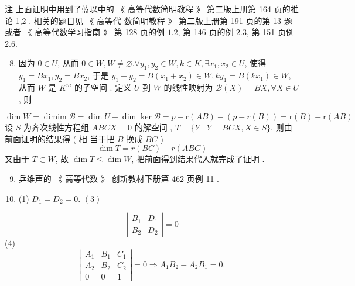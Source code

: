 \documentclass[10pt]{article}
\begin{document}
 注   上面证明中用到了蓝以中的 《 高等代数简明教程 》 第二版上册第  164  页的推论  1,2 .  相关的题目见  《 高等代   数简明教程 》 第二版上册第  191  页的第  13  题或者 《 高等代数学习指南 》 第  128  页的例  $1.2$,  第  146  页的例  $2.3$,  第  151  页例  $2.6$.

\begin{enumerate}
  \setcounter{enumi}{7}
  \item  因为  $0 \in U$,  从而  $0 \in W, W \neq \varnothing . \forall y_{1}, y_{2} \in W, k \in K, \exists x_{1}, x_{2} \in U$,  使得  $y_{1}=B x_{1}, y_{2}=B x_{2}$,  于是  $y_{1}+y_{2}=B\left(x_{1}+x_{2}\right) \in W, k y_{1}=B\left(k x_{1}\right) \in W$, 从而  $W$  是  $K^{m}$  的子空间 .  定义  $U$  到  $W$  的线性映射为  $\mathscr{B}(X)=B X, \forall X \in U$,  则 
\end{enumerate}
$$
\operatorname{dim} W=\operatorname{dimim} \mathscr{B}=\operatorname{dim} U-\operatorname{dim} \operatorname{ker} \mathscr{B}=p-\mathrm{r}(A B)-(p-r(B))=\mathrm{r}(B)-\mathrm{r}(A B)
$$
 设  $S$  为齐次线性方程组  $A B C X=0$  的解空间 , $T=\{Y \mid Y=B C X, X \in S\}$,  则由前面证明的结果得  ( 相   当于把  $B$  换成  $B C$ )
$$
\operatorname{dim} T=r(B C)-r(A B C)
$$
 又由于  $T \subset W$,  故  $\operatorname{dim} T \leqslant \operatorname{dim} W$,  把前面得到结果代入就完成了证明 .

\begin{enumerate}
  \setcounter{enumi}{8}
  \item  乒维声的 《 高等代数 》 创新教材下册第  462  页例  11 .

  \item (1) $D_{1}=D_{2}=0$. $(3)$

\end{enumerate}
$$
\left|\begin{array}{cc}
B_{1} & D_{1} \\
B_{2} & D_{2}
\end{array}\right|=0
$$
(4)
$$
\left|\begin{array}{ccc}
A_{1} & B_{1} & C_{1} \\
A_{2} & B_{2} & C_{2} \\
0 & 0 & 1
\end{array}\right|=0 \Longrightarrow A_{1} B_{2}-A_{2} B_{1}=0 .
$$
\end{document}
